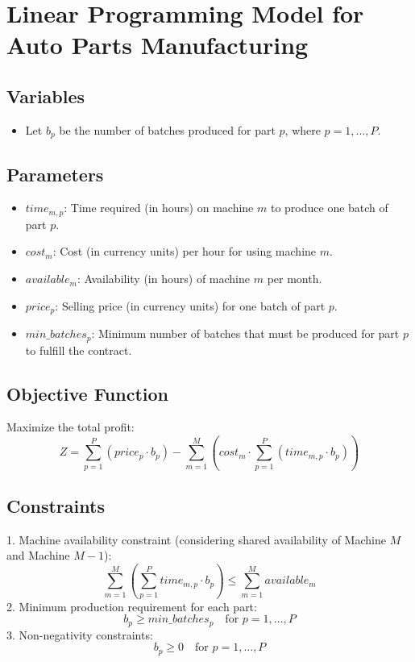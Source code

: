 \documentclass{article}
\begin{document}
\section*{Linear Programming Model for Auto Parts Manufacturing}

\subsection*{Variables}
\begin{itemize}
    \item Let \( b_p \) be the number of batches produced for part \( p \), where \( p = 1, \ldots, P \).
\end{itemize}

\subsection*{Parameters}
\begin{itemize}
    \item \( time_{m,p} \): Time required (in hours) on machine \( m \) to produce one batch of part \( p \).
    \item \( cost_m \): Cost (in currency units) per hour for using machine \( m \).
    \item \( available_m \): Availability (in hours) of machine \( m \) per month.
    \item \( price_p \): Selling price (in currency units) for one batch of part \( p \).
    \item \( min\_batches_p \): Minimum number of batches that must be produced for part \( p \) to fulfill the contract.
\end{itemize}

\subsection*{Objective Function}
Maximize the total profit:
\[
Z = \sum_{p=1}^{P} (price_p \cdot b_p) - \sum_{m=1}^{M} \left( cost_m \cdot \sum_{p=1}^{P} (time_{m,p} \cdot b_p) \right)
\]

\subsection*{Constraints}
1. Machine availability constraint (considering shared availability of Machine \( M \) and Machine \( M-1 \)):
\[
\sum_{m=1}^{M} \left( \sum_{p=1}^{P} time_{m,p} \cdot b_p \right) \leq \sum_{m=1}^{M} available_m
\]
2. Minimum production requirement for each part:
\[
b_p \geq min\_batches_p \quad \text{for } p = 1, \ldots, P
\]
3. Non-negativity constraints:
\[
b_p \geq 0 \quad \text{for } p = 1, \ldots, P
\]
\end{document}
